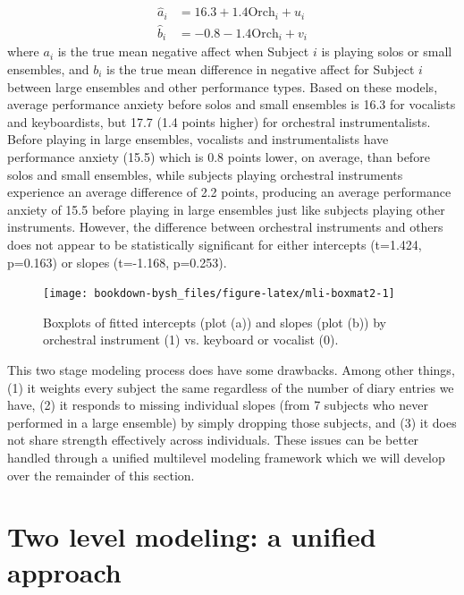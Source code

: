 \documentclass[
]{krantz}
\begin{document}
\begin{align}
\hat{a}_{i} & = 16.3+1.4\textrm{Orch}_{i}+u_{i}
\label{eq:level2s0hat}  \\
\hat{b}_{i} & = -0.8-1.4\textrm{Orch}_{i}+v_{i}
\nonumber
\end{align}
where \(a_{i}\) is the true mean negative affect when Subject \(i\) is playing solos or small ensembles, and \(b_{i}\) is the true mean difference in negative affect for Subject \(i\) between large ensembles and other performance types. Based on these models, average performance anxiety before solos and small ensembles is 16.3 for vocalists and keyboardists, but 17.7 (1.4 points higher) for orchestral instrumentalists. Before playing in large ensembles, vocalists and instrumentalists have performance anxiety (15.5) which is 0.8 points lower, on average, than before solos and small ensembles, while subjects playing orchestral instruments experience an average difference of 2.2 points, producing an average performance anxiety of 15.5 before playing in large ensembles just like subjects playing other instruments. However, the difference between orchestral instruments and others does not appear to be statistically significant for either intercepts (t=1.424, p=0.163) or slopes (t=-1.168, p=0.253).

\begin{figure}

{\centering \texttt{[image: bookdown-bysh\_files/figure-latex/mli-boxmat2-1]} 

}

\caption{Boxplots of fitted intercepts (plot (a)) and slopes (plot (b)) by orchestral instrument (1) vs. keyboard or vocalist (0).}\label{fig:mli-boxmat2}
\end{figure}

This two stage modeling process does have some drawbacks. Among other things, (1) it weights every subject the same regardless of the number of diary entries we have, (2) it responds to missing individual slopes (from 7 subjects who never performed in a large ensemble) by simply dropping those subjects, and (3) it does not share strength effectively across individuals. These issues can be better handled through a unified multilevel modeling framework which we will develop over the remainder of this section.

\hypertarget{twolevelmodelingunified}{%
\section{Two level modeling: a unified approach}\label{twolevelmodelingunified}}
\end{document}
